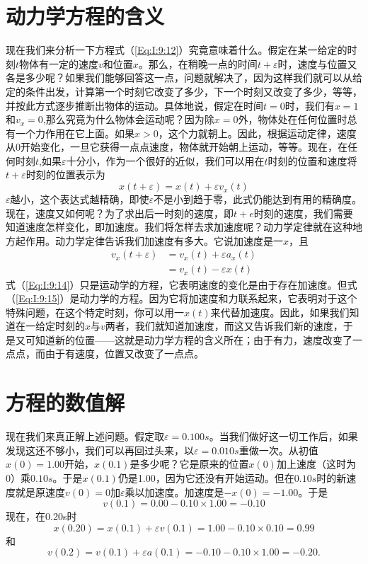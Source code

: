 \section{动力学方程的含义}

现在我们来分析一下方程式（\ref{Eq:I:9:12}）究竟意味着什么。假定在某一给定的时刻$t$物体有一定的速度$v$和位置$x$。那么，在稍晚一点的时间$t+\varepsilon $时，速度与位置又各是多少呢？如果我们能够回答这一点，问题就解决了，因为这样我们就可以从给定的条件出发，计算第一个时刻它改变了多少，下一个时刻又改变了多少，等等，并按此方式逐步推断出物体的运动。具体地说，假定在时间$t=0$时，我们有$x=1$和$v_x=0$,那么究竟为什么物体会运动呢？因为除$x=0$外，物体处在任何位置时总有一个力作用在它上面。如果$x>0$，这个力就朝上。因此，根据运动定律，速度从0开始变化，一旦它获得一点点速度，物体就开始朝上运动，等等。现在，在任何时刻$t$,如果$\varepsilon $十分小，作为一个很好的近似，我们可以用在$t$时刻的位置和速度将$t+\varepsilon $时刻的位置表示为
\begin{equation}
    \label{Eq:I:9:13}
    x(t+\varepsilon)=x(t)+\varepsilon v_x(t)
\end{equation}
$\varepsilon $越小，这个表达式越精确，即使$\varepsilon $不是小到趋于零，此式仍能达到有用的精确度。现在，速度又如何呢？为了求出后一时刻的速度，即$t+e$时刻的速度，我们需要知道速度怎样变化，即加速度。我们将怎样去求加速度呢？动力学定律就在这种地方起作用。动力学定律告诉我们加速度有多大。它说加速度是一$x$，且
\begin{align}
    \label{Eq:I:9:14}
    v_x(t+\varepsilon)&=v_x(t)+\varepsilon a_x(t) \\
    \label{Eq:I:9:15}
    &=v_x(t)-\varepsilon x(t)
\end{align}
式（\ref{Eq:I:9:14}）只是运动学的方程，它表明速度的变化是由于存在加速度。但式（\ref{Eq:I:9:15}）是动力学的方程。因为它将加速度和力联系起来，它表明对于这个特殊问题，在这个特定时刻，你可以用一$x(t)$来代替加速度。因此，如果我们知道在一给定时刻的$x$与$v$两者，我们就知道加速度，而这又告诉我们新的速度，于是又可知道新的位置——这就是动力学方程的含义所在；由于有力，速度改变了一点点，而由于有速度，位置又改变了一点点。

\section{方程的数值解}

现在我们来真正解上述问题。假定取$\varepsilon =0.100s$。当我们做好这一切工作后，如果发现这还不够小，我们可以再回过头来，以$\varepsilon =0.010s$重做一次。从初值$x(0)=1.00$开始，$x(0.1)$是多少呢？它是原来的位置$x(0)$加上速度（这时为0）乘$0.10s$。于是$x(0.1)$仍是1.00，因为它还没有开始运动。但在$0.10s$时的新速度就是原速度$v(0)=0$加$\varepsilon $乘以加速度。加速度是$-x(0)=-1.00$。于是
\begin{equation*}
    v(0.1)=0.00-0.10 \times 1.00 = -0.10
\end{equation*}
现在，在0.20s时
\begin{equation*}
x(0.20)=x(0.1)+\varepsilon v(0.1)=1.00-0.10 \times 0.10=0.99
\end{equation*}
和
\begin{equation*}
v(0.2)=v(0.1)+\varepsilon a(0.1)=-0.10-0.10 \times 1.00=-0.20.
\end{equation*}

